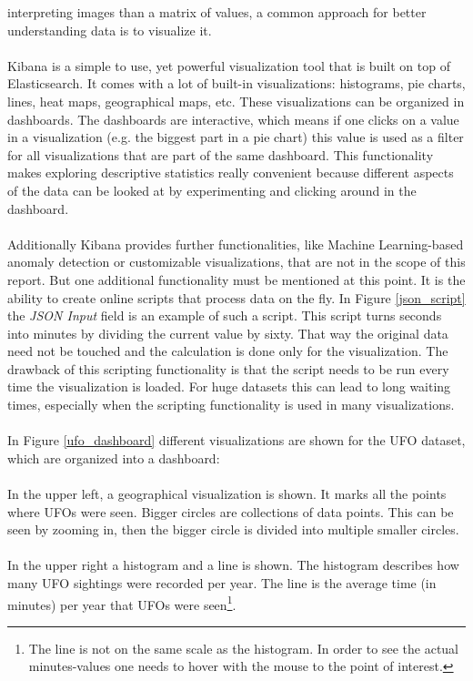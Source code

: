 \documentclass[bibliography=totoc]{article}
\begin{document}
interpreting images than a matrix of values, a common approach for better understanding data 
is to visualize it.
\\
\\
Kibana is a simple to use, yet powerful visualization tool that is built on top 
of Elasticsearch. It comes with a lot of built-in visualizations: histograms, 
pie charts, lines, heat maps, geographical maps, etc. These visualizations can be organized
in dashboards. The dashboards are interactive, which means if one clicks on 
a value in a visualization (e.g. the biggest part in a pie chart) this value is used
as a filter for all visualizations that are part of the same dashboard.
This functionality makes exploring descriptive statistics really convenient 
because different aspects of the data can be looked at by experimenting and clicking
around in the dashboard.
\\
\\
Additionally Kibana provides further functionalities, like Machine Learning-based anomaly detection or customizable visualizations, that are not in the scope of this report. But one additional functionality must be mentioned at this point.
It is the 
ability to create online scripts that process data on the fly. In Figure \ref{json_script} 
the \textit{JSON Input} field is an example of such a script. This script turns seconds
into minutes by dividing the current value by sixty. That way the original data need not
be touched and the calculation is done only for the visualization. The drawback of this
scripting functionality is that the script needs to be run every time the visualization is loaded.
For huge datasets this can lead to long waiting times, especially when the scripting 
functionality is used in many visualizations.
\\
\\
In Figure \ref{ufo_dashboard} different visualizations are shown for the UFO dataset,
which are organized into a dashboard:
\\
\\
In the upper left, a geographical visualization is shown. It marks all the points
where UFOs were seen. Bigger circles are collections of data points. This can be seen
by zooming in, then the bigger circle is divided into multiple smaller circles.
\\
\\
In the upper right a histogram and a line is shown. The histogram describes
how many UFO sightings were recorded per year. The line is the average time 
(in minutes) per year that UFOs were seen\footnote{The line is not on the same scale as the histogram.
In order to see the actual minutes-values one needs to hover with the mouse to the point of interest.}.
\end{document}
